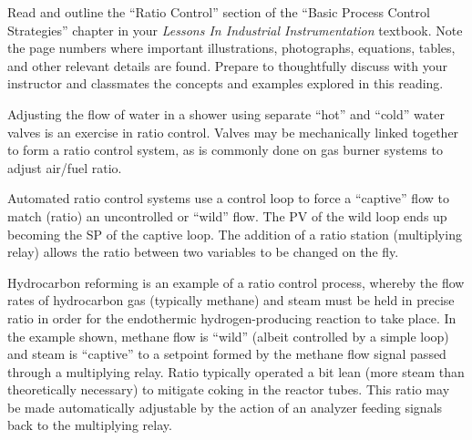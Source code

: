 

Read and outline the ``Ratio Control'' section of the ``Basic Process Control Strategies'' chapter in your {\it Lessons In Industrial Instrumentation} textbook.  Note the page numbers where important illustrations, photographs, equations, tables, and other relevant details are found.  Prepare to thoughtfully discuss with your instructor and classmates the concepts and examples explored in this reading.














Adjusting the flow of water in a shower using separate ``hot'' and ``cold'' water valves is an exercise in ratio control.  Valves may be mechanically linked together to form a ratio control system, as is commonly done on gas burner systems to adjust air/fuel ratio.

\vskip 10pt

Automated ratio control systems use a control loop to force a ``captive'' flow to match (ratio) an uncontrolled or ``wild'' flow.  The PV of the wild loop ends up becoming the SP of the captive loop.  The addition of a ratio station (multiplying relay) allows the ratio between two variables to be changed on the fly.

\vskip 10pt

Hydrocarbon reforming is an example of a ratio control process, whereby the flow rates of hydrocarbon gas (typically methane) and steam must be held in precise ratio in order for the endothermic hydrogen-producing reaction to take place.  In the example shown, methane flow is ``wild'' (albeit controlled by a simple loop) and steam is ``captive'' to a setpoint formed by the methane flow signal passed through a multiplying relay.  Ratio typically operated a bit lean (more steam than theoretically necessary) to mitigate coking in the reactor tubes.  This ratio may be made automatically adjustable by the action of an analyzer feeding signals back to the multiplying relay.








